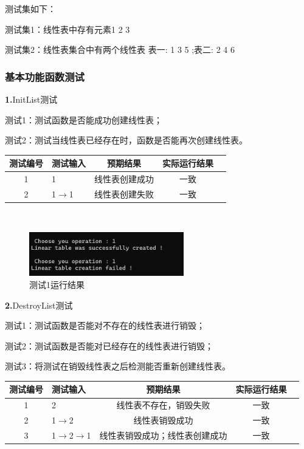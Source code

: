 \documentclass[supercite]{Experimental_Report}
\theoremstyle{definition}
\begin{document}
测试集如下：

测试集1：线性表中存有元素1 2 3

测试集2：线性表集合中有两个线性表 表一: 1 3 5 ;表二: 2 4 6 

\setcounter{paragraph}{0}

\subsubsection{基本功能函数测试}

\noindent\textbf{ 1.}InitList测试

测试1：测试函数是否能成功创建线性表；

测试2：测试当线性表已经存在时，函数是否能再次创建线性表。

\vspace{0.5em}

\begin{tabular}{|c|l|c|c|c|}
	\hline
	测试编号 & 测试输入 & 预期结果 & 实际运行结果 \\
	\hline
	1 & 1 & 线性表创建成功 & 一致 \\
	\hline
	2 & 1$\rightarrow$1 & 线性表创建失败 & 一致 \\
	\hline
\end{tabular}

~\

 \begin{figure}[H]
 	\centering
 	\includegraphics[width=0.6\textwidth]{images/线性表测试1.png}
 	\caption{测试1运行结果}
 	\label{txlab}
 \end{figure}


\noindent\textbf{ 2.}DestroyList测试

测试1：测试函数是否能对不存在的线性表进行销毁；

测试2：测试函数是否能对已经存在的线性表进行销毁；

测试3：将测试在销毁线性表之后检测能否重新创建线性表。

\vspace{0.5em}

\begin{tabular}{|c|l|c|c|c|}
	\hline
	测试编号 & 测试输入 & 预期结果 & 实际运行结果 \\
	\hline
	1 & 2 & 线性表不存在，销毁失败 & 一致 \\
	\hline
	2 & 1$\rightarrow$2 & 线性表销毁成功 & 一致 \\
	\hline
	3 & 1$\rightarrow$2$\rightarrow$1 & 线性表销毁成功；线性表创建成功 & 一致 \\
	\hline
\end{tabular}
\end{document}
